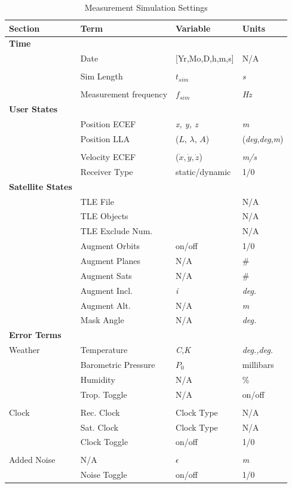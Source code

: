\documentclass[12pt]{report}
\begin{document}
\begin{table}[hbt!]
    \centering
    \begin{tabular}{m{3cm} m{5cm} m{3cm} m{3cm}}
        \hline
        Section & Term & Variable & Units \\
        \hline
        \textbf{Time} & & & \\
        & Date & [Yr,Mo,D,h,m,s] &  N/A \\
        & & & \\
         & Sim Length & $t_{sim} $ & \textit{s} \\
         & & &  \\
         & Measurement frequency & $f_{sim}$ & \textit{Hz} \\
         \hline
         \textbf{User States} & & & \\
        & Position ECEF & \textit{x, y, z} & \textit{m}\\
         & Position LLA & ($L$, $\lambda$, $A$) & (\textit{deg},\textit{deg},\textit{m}) \\
         & & & \\
         & Velocity ECEF & ($\dot{x}, \dot{y}, \dot{z}$) & \textit{m/s} \\
         & Receiver Type & static/dynamic & 1/0 \\
        \hline
        \textbf{Satellite States} & & & \\
        & TLE File & & N/A \\
        & TLE Objects & & N/A \\
        & TLE Exclude Num. & & N/A \\
        & Augment Orbits & on/off & 1/0 \\
        & Augment Planes & N/A& \# \\
        & Augment Sats & N/A & \# \\
        & Augment Incl. & \textit{i} & \textit{deg.} \\
        & Augment Alt. & N/A & \textit{m} \\
        & Mask Angle & N/A & \textit{deg.} \\
        \hline
        \textbf{Error Terms} & & & \\
        Weather & Temperature & \textit{C,K} & \textit{deg.,deg.} \\
        & Barometric Pressure & $P_0$ & millibars \\
        & Humidity & N/A & \% \\
        & Trop. Toggle & N/A & on/off \\
        & & & \\
        Clock & Rec. Clock & Clock Type & N/A \\
        & Sat. Clock & Clock Type & N/A \\
        & Clock Toggle & on/off & 1/0 \\
        & & & \\
        Added Noise & N/A & $\epsilon$ & \textit{m} \\
        & Noise Toggle & on/off & 1/0 \\
        \hline
    \end{tabular}
        \caption{Measurement Simulation Settings}
        \label{table:measurementsimsettings}
\end{table}
\end{document}
